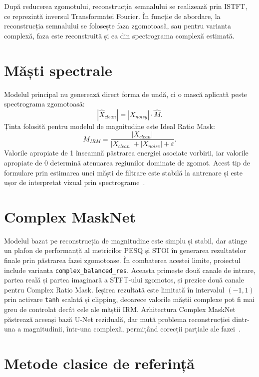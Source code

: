 \documentclass[12pt,a4paper]{report}
\begin{document}
După reducerea zgomotului, reconstrucția semnalului se realizează prin ISTFT, ce reprezintă inversul Transformatei Fourier. 
În funcție de abordare, la reconstrucția semnalului se folosește faza zgomotoasă, sau pentru varianta complexă, faza este 
reconstruită și ea din spectrograma complexă estimată.

\section{Măști spectrale}

Modelul principal nu generează direct forma de undă, ci o mască aplicată peste
spectrograma zgomotoasă:
\[
|\hat{X}_{clean}| = |X_{noisy}| \cdot \hat{M}.
\]
Ținta folosită pentru modelul de magnitudine este Ideal Ratio Mask:
\[
M_{IRM}=\frac{|X_{clean}|}{|X_{clean}|+|X_{noise}|+\varepsilon}.
\]
Valorile apropiate de 1 înseamnă păstrarea energiei asociate vorbirii,
iar valorile apropiate de 0 determină atenuarea regiunilor dominate de zgomot. 
Acest tip de formulare prin estimarea unei măști de filtrare este stabilă la antrenare 
și este ușor de interpretat vizual prin spectrograme~\cite{ideal_mask}.

\section{Complex MaskNet}

Modelul bazat pe reconstrucția de magnitudine este simplu și stabil, 
dar atinge un plafon de performanță al metricilor PESQ și STOI în 
generarea rezultatelor finale prin păstrarea fazei zgomotoase. 
În combaterea acestei limite, proiectul include varianta \texttt{complex\_balanced\_res}. 
Aceasta primește două canale de intrare, partea reală și partea imaginară a STFT-ului zgomotos, 
și prezice două canale pentru Complex Ratio Mask. Ieșirea rezultată este limitată 
în intervalul \((-1, 1)\) prin activare \texttt{tanh} scalată și clipping, deoarece valorile măștii 
complexe pot fi mai greu de controlat decât cele ale măștii IRM.
Arhitectura Complex MaskNet păstrează aceeași bază U-Net reziduală, dar mută problema 
reconstrucției dintr-una a magnitudinii, într-una complexă, permițând corecții parțiale ale fazei~\cite{complex_mask}.

\section{Metode clasice de referință}
\end{document}
